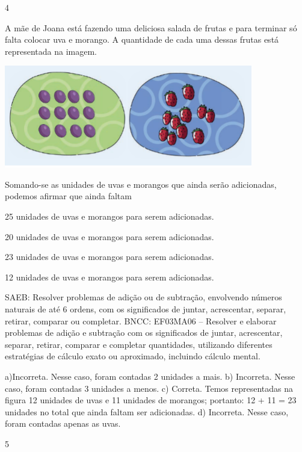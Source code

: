 \begin{multicols}{2}
\begin{enumerate}
{\num{4}

A mãe de Joana está fazendo uma deliciosa salada de frutas e para terminar só falta colocar uva e morango. A quantidade de cada uma dessas frutas está representada na imagem.


\includegraphics[width=4.26704in,height=1.75849in]{media/image132.png}

Somando-se as unidades de uvas e morangos que ainda serão adicionadas, podemos afirmar que ainda faltam

\begin{escolha}

\item
  25 unidades de uvas e morangos para serem adicionadas.
\item
  20 unidades de uvas e morangos para serem adicionadas.
\item
  23 unidades de uvas e morangos para serem adicionadas.
\item
  12 unidades de uvas e morangos para serem adicionadas.
\end{escolha}

SAEB: Resolver problemas de adição ou de subtração,
envolvendo números naturais de até 6 ordens, com os significados de
juntar, acrescentar, separar, retirar, comparar ou completar.
BNCC: EF03MA06 – Resolver e elaborar problemas de adição e subtração com os significados de
juntar, acrescentar, separar, retirar, comparar e completar quantidades, utilizando diferentes
estratégias de cálculo exato ou aproximado, incluindo cálculo mental.

a)Incorreta. Nesse caso, foram contadas 2 unidades a mais.
b) Incorreta. Nesse caso, foram contadas 3 unidades a menos.
c) Correta. Temos representadas na figura 12 unidades de uvas e 11 unidades de morangos; portanto: 12 + 11 = 23 unidades no total que ainda faltam ser adicionadas.
d) Incorreta. Nesse caso, foram contadas apenas as uvas.

\num{5}

}
\end{enumerate}
\end{multicols}
